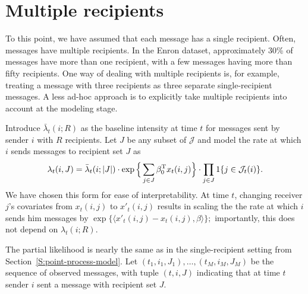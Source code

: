\documentclass[aoas,preprint]{imsart}
\begin{document}
\section{Multiple recipients}

To this point, we have assumed that each message has a single recipient.
Often, messages have multiple recipients.  In the Enron dataset,
approximately 30\% of messages have more than one recipient, with
a few messages having more than fifty recipients.  One way of dealing
with multiple recipients is, for example, treating a message with three
recipients as three separate single-recipient messages.  A less ad-hoc
approach is to explicitly take multiple recipients into account at the
modeling stage.

Introduce $\bar \lambda_t(i ; R)$ as the baseline intensity at time $t$ for
messages sent by sender $i$ with $R$ recipients.  Let $J$ be any
subset of $\mathcal{J}$ and model the rate at which $i$ sends messages to
recipient set $J$ as
\begin{equation}\label{E:intensity-multiple}
    \lambda_t(i,J)
        =
        \bar \lambda_t(i ; |J|)
        \cdot
        \exp\Big\{
            \sum_{j \in J}
                \beta_0^\trans  x_t(i,j)
        \Big\}
        \cdot
        \prod_{j \in J}
        1\{ j \in \mathcal{J}_t(i) \}
        .
\end{equation}
We have chosen this form for ease of interpretability.  At time
$t$, changing receiver $j$'s covariates from $x_t(i,j)$ to
$x'_t(i,j)$ results in scaling the the rate at
which $i$ sends him messages by
\(
    \exp\{ \langle x'_t(i,j) - x_t(i,j), \beta \rangle \};
\)
importantly, this does not depend on $\lambda_t(i; R)$.

The partial likelihood is nearly the same as in the single-recipient
setting from Section~\ref{S:point-process-model}.
Let $(t_1, i_1, J_1), \ldots, (t_M, i_M, J_M)$ be the sequence of
observed messages, with tuple $(t, i, J)$ indicating that at time $t$
sender $i$ sent a message with recipient set $J$.


\clearpage 
\end{document}

